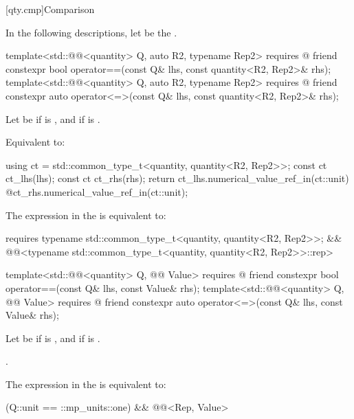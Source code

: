 [qty.cmp]{Comparison}

\pnum
In the following descriptions,
let  be the .

\begin{itemdecl}
template<std::@@<quantity> Q, auto R2, typename Rep2>
  requires @\seebelownc@
friend constexpr bool operator==(const Q& lhs, const quantity<R2, Rep2>& rhs);
template<std::@@<quantity> Q, auto R2, typename Rep2>
  requires @\seebelownc@
friend constexpr auto operator<=>(const Q& lhs, const quantity<R2, Rep2>& rhs);
\end{itemdecl}

\begin{itemdescr}
\pnum
Let  be
 if  is \tcode{==}, and
 if  is \tcode{<=>}.

\pnum
\effects
Equivalent to:
\begin{codeblock}
using ct = std::common_type_t<quantity, quantity<R2, Rep2>>;
const ct ct_lhs(lhs);
const ct ct_rhs(rhs);
return ct_lhs.numerical_value_ref_in(ct::unit) @\atsign@ ct_rhs.numerical_value_ref_in(ct::unit);
\end{codeblock}

\pnum
\remarks
The expression in the  is equivalent to:
\begin{codeblock}
requires {
  typename std::common_type_t<quantity, quantity<R2, Rep2>>;
} && @@<typename std::common_type_t<quantity, quantity<R2, Rep2>>::rep>
\end{codeblock}
\end{itemdescr}

\begin{itemdecl}
template<std::@@<quantity> Q, @@ Value>
  requires @\seebelownc@
friend constexpr bool operator==(const Q& lhs, const Value& rhs);
template<std::@@<quantity> Q, @@ Value>
  requires @\seebelownc@
friend constexpr auto operator<=>(const Q& lhs, const Value& rhs);
\end{itemdecl}

\begin{itemdescr}
\pnum
Let  be
 if  is \tcode{==}, and
 if  is \tcode{<=>}.

\pnum
\returns
{}.

\pnum
\remarks
The expression in the  is equivalent to:
\begin{codeblock}
(Q::unit == ::mp_units::one) && @@<Rep, Value>
\end{codeblock}
\end{itemdescr}

